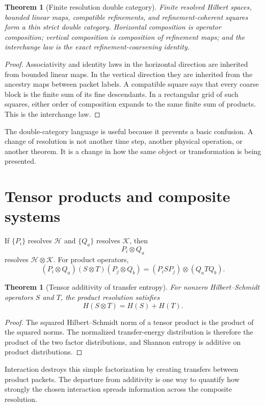 \documentclass[11pt,oneside]{book}
\newtheorem{theorem}[definition]{Theorem}
\theoremstyle{remark}
\begin{document}
\begin{theorem}[Finite resolution double category]
Finite resolved Hilbert spaces, bounded linear maps, compatible refinements, and refinement-coherent squares form a thin strict double category.  Horizontal composition is operator composition; vertical composition is composition of refinement maps; and the interchange law is the exact refinement-coarsening identity.
\end{theorem}

\begin{proof}
Associativity and identity laws in the horizontal direction are inherited from bounded linear maps.  In the vertical direction they are inherited from the ancestry maps between packet labels.  A compatible square says that every coarse block is the finite sum of its fine descendants.  In a rectangular grid of such squares, either order of composition expands to the same finite sum of products.  This is the interchange law.
\end{proof}

The double-category language is useful because it prevents a basic confusion.  A change of resolution is not another time step, another physical operation, or another theorem.  It is a change in how the same object or transformation is being presented.

\section{Tensor products and composite systems}
If \(\{P_i\}\) resolves \(\mathcal H\) and \(\{Q_a\}\) resolves \(\mathcal K\), then
\[
P_i\otimes Q_a
\]
resolves \(\mathcal H\otimes\mathcal K\).  For product operators,
\[
(P_i\otimes Q_a)(S\otimes T)(P_j\otimes Q_b)
=(P_iSP_j)\otimes(Q_aTQ_b).
\]

\begin{theorem}[Tensor additivity of transfer entropy]
For nonzero Hilbert--Schmidt operators \(S\) and \(T\), the product resolution satisfies
\[
H(S\otimes T)=H(S)+H(T).
\]
\end{theorem}

\begin{proof}
The squared Hilbert--Schmidt norm of a tensor product is the product of the squared norms.  The normalized transfer-energy distribution is therefore the product of the two factor distributions, and Shannon entropy is additive on product distributions.
\end{proof}

Interaction destroys this simple factorization by creating transfers between product packets.  The departure from additivity is one way to quantify how strongly the chosen interaction spreads information across the composite resolution.
\end{document}
